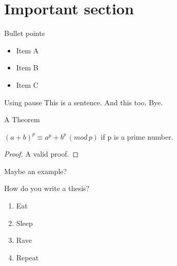 \documentclass{beamer}
\begin{document}
\section{Important section}
\begin{frame}{Bullet points}
\begin{itemize}
    \item Item A
    \item Item B
    \item Item C
\end{itemize}
\end{frame}
\begin{frame}{Using pause}
This is a sentence. \pause 
And this too. \pause
\alert{Bye}. 
\end{frame}

\begin{frame}{A Theorem}
\begin{theorem} 
 $(a+b)^p \equiv a^p + b^p \, (mod \,p)$ if p is a prime number.
\end{theorem} \pause
\begin{proof}
A valid proof.
\end{proof}
\begin{example}
Maybe an example?
\end{example}
\end{frame}







\begin{frame}{How do you write a thesis?}

\begin{enumerate}
    \item Eat
    \item Sleep
    \item Rave
    \item Repeat
\end{enumerate}
\end{frame}
\end{document}
